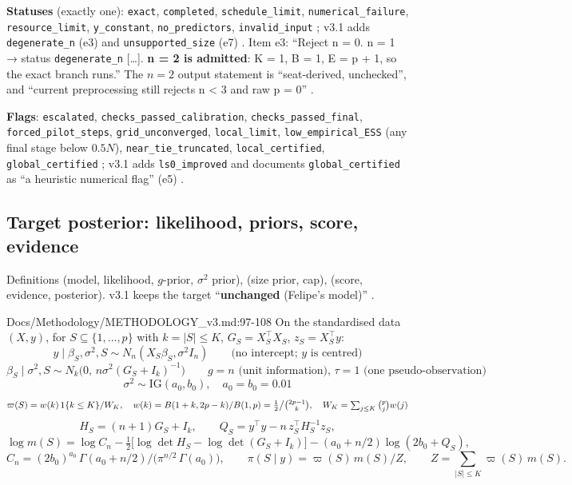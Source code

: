 \textbf{Statuses} (exactly one): \texttt{exact}, \texttt{completed}, \texttt{schedule\_limit}, \texttt{numerical\_failure},
\texttt{resource\_limit}, \texttt{y\_constant}, \texttt{no\_predictors}, \texttt{invalid\_input}
; v3.1 adds \texttt{degenerate\_n} (e3) and \texttt{unsupported\_size} (e7)
. Item e3: ``Reject n = 0. n = 1 → status
\texttt{degenerate\_n} [\dots]. \textbf{n = 2 is admitted}: K = 1, B = 1, E = p + 1, so the exact branch runs.'' The $n=2$
output statement is ``seat-derived, unchecked'', and ``current preprocessing still rejects n < 3 and raw p = 0''
.

\textbf{Flags}: \texttt{escalated}, \texttt{checks\_passed\_calibration}, \texttt{checks\_passed\_final},
\texttt{forced\_pilot\_steps}, \texttt{grid\_unconverged}, \texttt{local\_limit}, \texttt{low\_empirical\_ESS} (any final stage
below $0.5N$), \texttt{near\_tie\_truncated}, \texttt{local\_certified}, \texttt{global\_certified}
; v3.1 adds \texttt{ls0\_improved} and documents \texttt{global\_certified} as
``a heuristic numerical flag'' (e5) 
.

\subsection{Target posterior: likelihood, priors, score, evidence}\label{sec:method-target}

Definitions  (model, likelihood, $g$-prior, $\sigma^2$ prior),  (size prior, cap),  (score,
evidence, posterior). v3.1 keeps the target ``\textbf{unchanged} (Felipe's model)''
.

\begin{stmt}{Docs/Methodology/METHODOLOGY_v3.md:97-108}
On the standardised data $(X,y)$, for $S\subseteq\{1,\dots,p\}$ with $k=|S|\le K$, $G_S=X_S^\top X_S$, $z_S=X_S^\top y$:
\[
y\mid\beta_S,\sigma^2,S\sim N_n(X_S\beta_S,\sigma^2I_n)\qquad\text{(no intercept; $y$ is centred)}
\]
\[
\beta_S\mid\sigma^2,S\sim N_k\bigl(0,\,n\sigma^2(G_S+I_k)^{-1}\bigr)\qquad\text{$g=n$ (unit information), $\tau=1$ (one pseudo-observation)}
\]
\[
\sigma^2\sim\mathrm{IG}(a_0,b_0),\quad a_0=b_0=0.01
\]
\[
\varpi(S)=w(k)\,1\{k\le K\}/W_K,\quad w(k)=B(1+k,2p-k)/B(1,p)=\tfrac12\big/\tbinom{2p-1}{k},\quad W_K=\textstyle\sum_{j\le K}\binom pj w(j)
\]
\[
H_S=(n+1)G_S+I_k,\qquad Q_S=y^\top y-n\,z_S^\top H_S^{-1}z_S,
\]
\[
\log m(S)=\log C_n-\tfrac12\bigl[\log\det H_S-\log\det(G_S+I_k)\bigr]-(a_0+n/2)\log(2b_0+Q_S),
\]
\[
C_n=(2b_0)^{a_0}\,\Gamma(a_0+n/2)\big/\bigl(\pi^{n/2}\,\Gamma(a_0)\bigr),\qquad
\pi(S\mid y)=\varpi(S)\,m(S)/Z,\qquad Z=\textstyle\sum_{|S|\le K}\varpi(S)\,m(S).
\]
\end{stmt}

